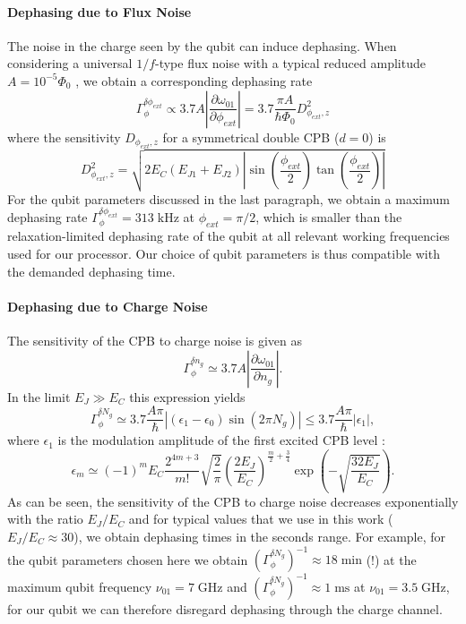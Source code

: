 \paragraph{Dephasing due to Flux Noise}

The noise in the charge seen by the qubit can induce dephasing. When considering a universal $1/f$-type flux noise with a typical reduced amplitude $A=10^{-5}\Phi_0$ \citep{koch_charge-insensitive_2007}, we obtain a corresponding dephasing rate
%
\begin{equation}
\Gamma_\phi^{\delta \phi_{ext}} \propto 3.7A\left|\frac{\partial \omega_{01}}{\partial \phi_{ext}}\right| = 3.7\frac{\pi A}{\hbar \Phi_0}D_{\phi_{ext},z}^2
\end{equation}
%
where the sensitivity $D_{\phi_{ext},z}$ for a symmetrical double CPB ($d=0$) is
%
\begin{equation}
D_{\phi_{ext},z}^2 = \sqrt{2E_C(E_{J1}+E_{J2})\left|\sin{\left(\frac{\phi_{ext}}{2}\right)}\tan{\left(\frac{\phi_{ext}}{2}\right)}\right|}
\end{equation}
%
For the qubit parameters discussed in the last paragraph, we obtain a maximum dephasing rate $\Gamma_\phi^{\delta \phi_{ext}}=313\;\mathrm{kHz}$ at $\phi_{ext}=\pi/2$, which is smaller than the relaxation-limited dephasing rate of the qubit at all relevant working frequencies used for our processor. Our choice of qubit parameters is thus compatible with the demanded dephasing time.

\paragraph{Dephasing due to Charge Noise}

The sensitivity of the CPB to charge noise is given as	
%
\begin{equation}
\Gamma_\phi^{\delta n_g} \simeq 3.7A \left|\frac{\partial \omega_{01}}{\partial n_g}\right|.
\end{equation}
%
In the limit $E_J\gg E_C$ this expression yields
%
\begin{equation}
\Gamma_\phi^{\delta N_g} \simeq 3.7\frac{A\pi}{\hbar}\left| (\epsilon_1-\epsilon_0)\sin{\left(2\pi N_g\right)}\right| \leq 3.7\frac{A\pi}{\hbar}|\epsilon_1|,
\end{equation}
%
where $\epsilon_1$ is the modulation amplitude of the first excited CPB level \citep{koch_charge-insensitive_2007}:
%
\begin{equation}
\epsilon_m\simeq (-1)^m E_C\frac{2^{4m+3}}{m!}\sqrt{\frac{2}{\pi}}\left(\frac{2E_J}{E_C}\right)^{\frac{m}{2}+\frac{3}{4}}\exp{\left(-\sqrt{\frac{32E_J}{E_C}}\right)}.
\end{equation}
%
As can be seen, the sensitivity of the CPB to charge noise decreases exponentially with the ratio $E_J/E_C$ and for typical values that we use in this work ($E_J/E_C\approx 30$), we obtain dephasing times in the seconds range. For example, for the qubit parameters chosen here we obtain $\left(\Gamma_{\phi}^{\delta N_g}\right)^{-1} \approx 18\;\mathrm{min}$ (!) at the maximum qubit frequency $\nu_{01}=7\;\mathrm{GHz}$ and  $\left(\Gamma_{\phi}^{\delta N_g}\right)^{-1} \approx 1\;\mathrm{ms}$ at $\nu_{01}=3.5\;\mathrm{GHz}$, for our qubit we can therefore disregard dephasing through the charge channel.

